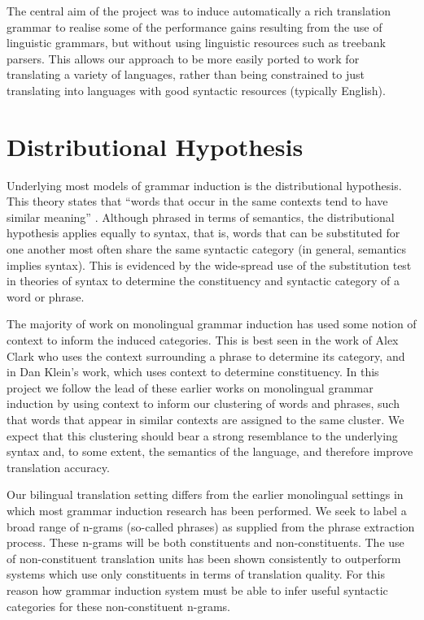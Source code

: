The central aim of the project was to induce automatically a rich translation grammar to realise some of the performance gains resulting from the use of linguistic grammars, but without using linguistic resources such as treebank parsers.
This allows our approach to be more easily ported to work for translating a variety of languages, rather than being constrained to just translating into languages with good syntactic resources (typically English).

\section{Distributional Hypothesis}

Underlying most models of grammar induction is the distributional hypothesis. This theory states that
``words that occur in the same contexts tend to have similar meaning'' \citep{harris:54}. Although phrased in terms of semantics, the distributional hypothesis applies equally to syntax, that is, words that can be substituted for one another most often share the same syntactic category (in general, semantics implies syntax). This is evidenced by the wide-spread use of the substitution test in theories of syntax to determine the constituency and syntactic category of a word or phrase.

The majority of work on monolingual grammar induction has used some notion of context to inform the induced categories. This is best seen in the work of Alex Clark who uses the context surrounding a phrase to determine its category, and in Dan Klein's work, which uses context to determine constituency. In this project we follow the lead of these earlier works on monolingual grammar induction by using context to inform our clustering of words and phrases, such that words that appear in similar contexts are assigned to the same cluster. We expect that this clustering should bear a strong resemblance to the underlying syntax and, to some extent, the semantics of the language, and therefore improve translation accuracy.

Our bilingual translation setting differs from the earlier monolingual settings in which most grammar induction research has been performed. We seek to label a broad range of n-grams (so-called phrases) as supplied from the phrase extraction process. These n-grams will be both constituents and non-constituents. The use of non-constituent translation units has been shown consistently to outperform systems which use only constituents in terms of translation quality. For this reason how grammar induction system must be able to infer useful syntactic categories for these non-constituent n-grams.

